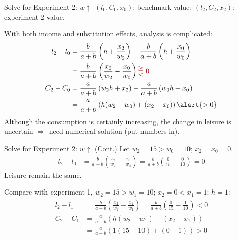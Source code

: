 \documentclass[11pt,aspectratio=169,usenames,dvipsnames]{beamer}
\newcommand{\red}[1]{\textcolor{red}{#1}}
\begin{document}
\begin{frame}{Solve for Experiment 2: $ w \uparrow $}
\label{slide:Solve_for_Experiment_2____w__uparrow__}
$ (l_{0}, C_{0}, x_{0} )$: benchmark value;
$ (l_{2}, C_{2}, x_{2} )$: experiment 2 value.

With both income and substitution effects, analysis is complicated:
%
\begin{align}
    l_{2} - l_{0}
        & = \frac{b}{a+b} \left( h + \frac{x_{2}}{w_{2}} \right)
          - \frac{b}{a+b} \left( h + \frac{x_{0}}{w_{0}} \right)
    \\
        & = \frac{b}{a+b} \left( \frac{x_{2}}{w_{2}} - \frac{x_{0}}{w_{0}} \right) \red{ \gtreqqless 0}
    \\
    C_{2} - C_{0}
        & = \frac{a}{a+b} \left( w_{2}h + x_{2} \right)
          - \frac{a}{a+b} \left( w_{0}h + x_{0} \right)
    \\
        & = \frac{a}{a+b} \left(
            h( w_{2} - w_{0} ) + ( x_{2} - x_{0} )
        \right) \alert{> 0}
\end{align}
%
Although the consumption is certainly increasing, \alert{the change in leisure is uncertain} $ \Rightarrow  $ need \alert{numerical solution} (put numbers in).

\end{frame}

\begin{frame}{Solve for Experiment 2: $ w \uparrow $ (Cont.)}
\label{slide:Solve_for_Experiment_2____w__uparrow____Cont__}
    Let $ w_{2} = 15 > w_{0} = 10 $; $ x_{2} = x_{0} = 0 $.
    \begin{align}
        l_{2} - l_{0}
            & = \frac{b}{a+b} \left( \frac{x_{2}}{w_{2}} - \frac{x_{0}}{w_{0}} \right)
                = \frac{b}{a+b} \left( \frac{0}{15} - \frac{0}{10} \right) = 0
    \end{align}
    Leisure remain the same.

    Compare with experiment 1, $ w_{2} = 15 > w_{1} = 10 $; $ x_{2} = 0 < x_{1} = 1$; $ h = 1 $:
    \begin{align}
        l_{2} - l_{1}
            & = \frac{b}{a+b} \left( \frac{x_{2}}{w_{2}} - \frac{x_{1}}{w_{1}} \right) = \frac{b}{a+b} \left( \frac{0}{15} - \frac{1}{10} \right) < 0
        \\
        C_{2} - C_{1}
            & = \frac{a}{a+b} \left( h( w_{2} - w_{1} ) + ( x_{2} - x_{1} ) \right)
        \\
            & = \frac{a}{a+b} ( 1 ( 15 - 10 ) + (0 - 1) ) > 0
    \end{align}

\end{frame}
\end{document}
